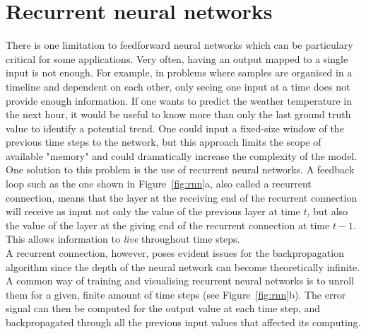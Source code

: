 \section{Recurrent neural networks}
There is one limitation to feedforward neural networks which can be particulary
critical for some applications. Very often, having an output mapped to a 
single input is not enough. For example, in problems where samples are organised
in a timeline and dependent on each other, only seeing one input at a time
does not provide enough information. If one wants to predict the weather
temperature in the next hour, it would be useful to know more than only the
last ground truth value to identify a potential trend. One 
could input a fixed-size window of the previous time steps to the network,
but this approach limits the scope of available "memory" and could dramatically
increase the complexity of the model.\\

One solution to this problem is the use of recurrent neural networks.
A feedback loop such as the one shown in Figure~\ref{fig:rnn}a, also called
a recurrent connection, means that the layer at the receiving end of the
recurrent connection will receive as input not only the value of the previous
layer at time $t$, but also the value of the layer at the giving end of the 
recurrent connection at time $t-1$. This allows information to \textit{live}
throughout time steps.\\

A recurrent connection, however, poses evident issues for the backpropagation
algorithm since the depth of the neural network can become theoretically
infinite.  A common way of training and visualising recurrent neural networks 
is to unroll them for a given, finite amount of time steps (see 
Figure~\ref{fig:rnn}b).  The error signal can then be computed
for the output value at each time step, and backpropagated through all the
previous input values that affected its computing.\\


